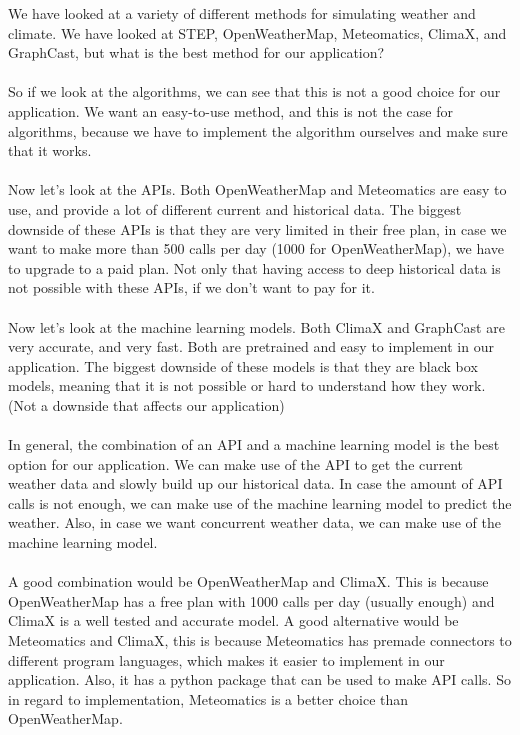 \documentclass[../paper.tex]{subfiles}
\begin{document}
    We have looked at a variety of different methods for simulating weather and climate.
    We have looked at STEP, OpenWeatherMap, Meteomatics, ClimaX, and GraphCast, but what is the best method for our application?
    \\\\
    So if we look at the algorithms, we can see that this is not a good choice for our application.
    We want an easy-to-use method, and this is not the case for algorithms, because we have to implement the algorithm ourselves and make sure that it works.
    \\\\
    Now let's look at the APIs.
    Both OpenWeatherMap and Meteomatics are easy to use, and provide a lot of different current and historical data.
    The biggest downside of these APIs is that they are very limited in their free plan, in case we want to make more than 500 calls per day (1000 for OpenWeatherMap), we have to upgrade to a paid plan.
    Not only that having access to deep historical data is not possible with these APIs, if we don't want to pay for it.
    \\\\
    Now let's look at the machine learning models.
    Both ClimaX and GraphCast are very accurate, and very fast.
    Both are pretrained and easy to implement in our application.
    The biggest downside of these models is that they are black box models, meaning that it is not possible or hard to understand how they work.
    (Not a downside that affects our application)
    \\\\
    In general, the combination of an API and a machine learning model is the best option for our application.
    We can make use of the API to get the current weather data and slowly build up our historical data.
    In case the amount of API calls is not enough, we can make use of the machine learning model to predict the weather.
    Also, in case we want concurrent weather data, we can make use of the machine learning model.
    \\\\
    A good combination would be OpenWeatherMap and ClimaX\@.
    This is because OpenWeatherMap has a free plan with 1000 calls per day (usually enough) and ClimaX is a well tested and accurate model.
    A good alternative would be Meteomatics and ClimaX, this is because Meteomatics has pre\-made connectors to different program languages, which makes it easier to implement in our application.
    Also, it has a python package that can be used to make API calls.
    So in regard to implementation, Meteomatics is a better choice than OpenWeatherMap.
\end{document}
